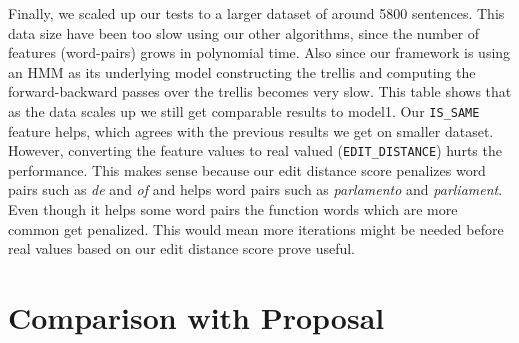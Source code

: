 \documentclass[11pt,letterpaper]{article}
\begin{document}
\begin{table}[h]
\centering
{}
\caption{\label{tab:sgdp} Performance FEM-SGD-P trained on 5K sentences (5 iterations) and tested on 200}
\end{table}

Finally, we scaled up our tests to a larger dataset of around 5800 sentences. This data size have been too slow using our other algorithms, since the number of features (word-pairs) grows in polynomial time. Also since our framework is using an HMM as its underlying model constructing the trellis and computing the forward-backward passes over the trellis becomes very slow. This table shows that as the data scales up we still get comparable results to model1. Our \texttt{IS\_SAME} feature helps, which agrees with the previous results we get on smaller dataset. However, converting the feature values to real valued (\texttt{EDIT\_DISTANCE}) hurts the performance. This makes sense because our edit distance score penalizes word pairs such as \textit{de} and \textit{of} and helps word pairs such as \textit{parlamento} and \textit{parliament}. Even though it helps some word pairs the function words which are more common get penalized. This would mean more iterations might be needed before real values based on our edit distance score prove useful.

\section{Comparison with Proposal}
\end{document}
